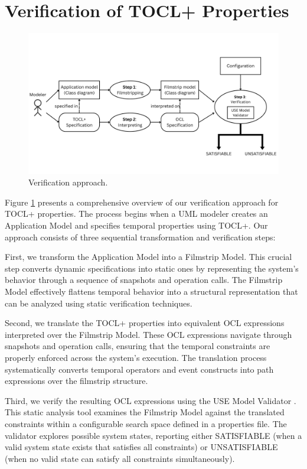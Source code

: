 \section{Verification of TOCL+ Properties}

\begin{figure}
    \centering
    \includegraphics[width=1\textwidth]{figures/c2/Verification_approach_1.png}
    \caption{Verification approach.}
    \label{sec:verification_approach}
\end{figure}

\hspace{1cm} Figure \ref{sec:verification_approach} presents a comprehensive overview 
of our verification approach for TOCL+ properties. The process begins when a UML 
modeler creates an Application Model and specifies temporal properties using TOCL+. 
Our approach consists of three sequential transformation and verification steps:

First, we transform the Application Model into a Filmstrip Model. This crucial step 
converts dynamic specifications into static ones by representing the system's behavior 
through a sequence of snapshots and operation calls. The Filmstrip Model effectively 
flattens temporal behavior into a structural representation that can be analyzed 
using static verification techniques.

Second, we translate the TOCL+ properties into equivalent OCL expressions interpreted 
over the Filmstrip Model. These OCL expressions navigate through snapshots and 
operation calls, ensuring that the temporal constraints are properly enforced across 
the system's execution. The translation process systematically converts temporal 
operators and event constructs into path expressions over the filmstrip structure.

Third, we verify the resulting OCL expressions using the USE Model Validator 
\cite{USE_Validator}. This static analysis tool examines the Filmstrip Model against 
the translated constraints within a configurable search space defined in a properties 
file. The validator explores possible system states, reporting either SATISFIABLE 
(when a valid system state exists that satisfies all constraints) or UNSATISFIABLE 
(when no valid state can satisfy all constraints simultaneously).

